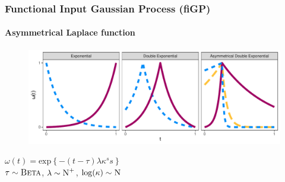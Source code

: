 \documentclass{snedecorbeamer}
\begin{document}

\begin{frame}
  \frametitle{Functional Input Gaussian Process (fiGP)}
  \framesubtitle{Asymmetrical Laplace function}

  \begin{figure}[h!]
	\centering
    \includegraphics[width=.7\textwidth]{02-alf-weight-plot}%
  \end{figure}
  \begin{center}
    $\omega(t) = \text{exp}\left\{-(t - \tau) \lambda \kappa^s s\right\}$\\
    $\tau \sim \textsc{Beta}$,
    $\lambda \sim \textsc{N}^{+}$,
    $\log(\kappa) \sim \textsc{N}$
  \end{center}

  \blankfootnote{
    $\omega(t): \mathcal{T} = [0, 1] \to (0, 1]$,
    $s = \text{sign}(t - \tau)$,
    $\tau > 0$,
    $\lambda > 0$,
    $\kappa > 0$
  }
\end{frame}
\end{document}
